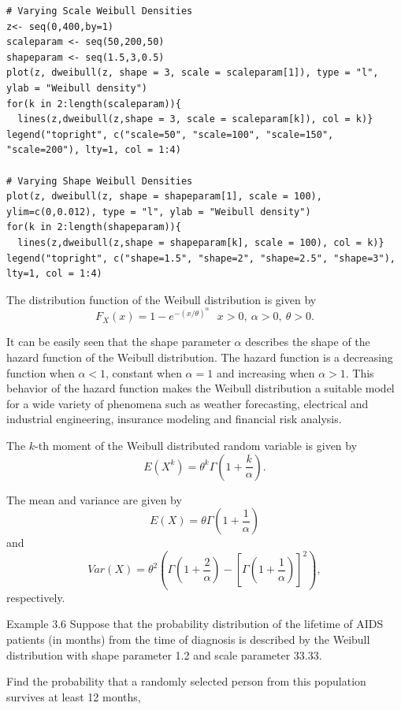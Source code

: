 \documentclass[]{book}
\begin{document}
\hypertarget{display.ux20Weibullscale.2}{}
\begin{verbatim}
# Varying Scale Weibull Densities
z<- seq(0,400,by=1)
scaleparam <- seq(50,200,50)
shapeparam <- seq(1.5,3,0.5)
plot(z, dweibull(z, shape = 3, scale = scaleparam[1]), type = "l", ylab = "Weibull density")
for(k in 2:length(scaleparam)){
  lines(z,dweibull(z,shape = 3, scale = scaleparam[k]), col = k)}
legend("topright", c("scale=50", "scale=100", "scale=150", "scale=200"), lty=1, col = 1:4)

# Varying Shape Weibull Densities
plot(z, dweibull(z, shape = shapeparam[1], scale = 100), ylim=c(0,0.012), type = "l", ylab = "Weibull density")
for(k in 2:length(shapeparam)){
  lines(z,dweibull(z,shape = shapeparam[k], scale = 100), col = k)}
legend("topright", c("shape=1.5", "shape=2", "shape=2.5", "shape=3"), lty=1, col = 1:4)
\end{verbatim}

The distribution function of the Weibull distribution is given by
\[F_{X}\left( x \right) = 1 - e^{- \left( x / \theta \right)^{\alpha}}  \ \ \ x >  0,\ \alpha >  0,\ \theta > 0.\]

It can be easily seen that the shape parameter \(\alpha\) describes the
shape of the hazard function of the Weibull distribution. The hazard
function is a decreasing function when \(\alpha < 1\), constant when
\(\alpha = 1\) and increasing when \(\alpha > 1\). This behavior of the
hazard function makes the Weibull distribution a suitable model for a
wide variety of phenomena such as weather forecasting, electrical and
industrial engineering, insurance modeling and financial risk analysis.

The \(k\)-th moment of the Weibull distributed random variable is given
by
\[E\left( X^{k} \right) = \theta^{k}\Gamma\left( 1 + \frac{k}{\alpha} \right) .\]

The mean and variance are given by
\[E\left( X \right) = \theta\Gamma\left( 1 + \frac{1}{\alpha} \right)\]
and
\[Var(X)= \theta^{2}\left( \Gamma\left( 1 + \frac{2}{\alpha} \right)  - \left\lbrack \Gamma\left( 1 + \frac{1}{\alpha} \right) \right\rbrack  ^{2}\right),\]
respectively.

Example 3.6 Suppose that the probability distribution of the lifetime of
AIDS patients (in months) from the time of diagnosis is described by the
Weibull distribution with shape parameter 1.2 and scale parameter 33.33.

Find the probability that a randomly selected person from this
population survives at least 12 months,
\end{document}
